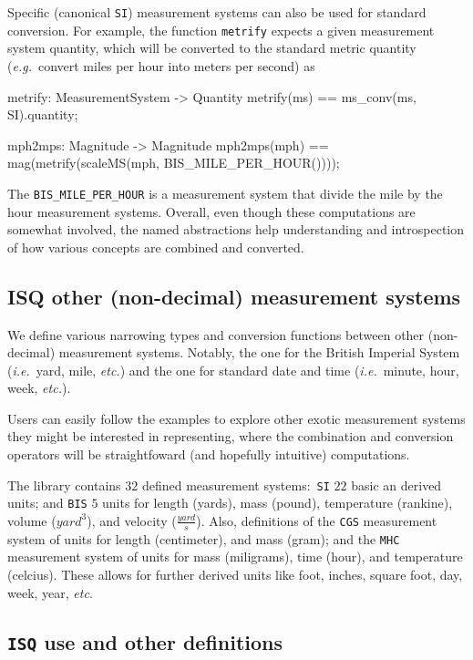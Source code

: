 \documentclass[runningheads,a4paper]{llncs}
\begin{document}
Specific (canonical \texttt{SI}) measurement systems can also be used for standard conversion. For example, the function \texttt{metrify} expects a given measurement system quantity, which will be converted to the standard metric quantity (\textit{e.g.}~convert miles per hour into meters per second) as
%
\begin{vdmsl}[frame=none,basicstyle=\ttfamily\scriptsize]
    metrify: MeasurementSystem -> Quantity
    metrify(ms) == ms_conv(ms, SI).quantity;

    mph2mps: Magnitude -> Magnitude
    mph2mps(mph) ==	mag(metrify(scaleMS(mph, BIS_MILE_PER_HOUR())));
\end{vdmsl}
%
\noindent The \texttt{BIS\_MILE\_PER\_HOUR} is a measurement system that divide the mile by the hour measurement systems. Overall, even though these computations are somewhat involved, the named abstractions help understanding and introspection of how various concepts are combined and converted.  

\subsection*{ISQ other (non-decimal) measurement systems}

We define various narrowing types and conversion functions between other (non-decimal) measurement systems. Notably, the one for the British Imperial System (\textit{i.e.}~yard, mile, \textit{etc.}) and the one for standard date and time (\textit{i.e.}~minute, hour, week, \textit{etc.}). 

Users can easily follow the examples to explore other exotic measurement systems they might be interested in representing, where the combination and conversion operators will be straightfoward (and hopefully intuitive) computations. 

The library contains \(32\) defined measurement systems:~\texttt{SI} \(22\) basic an derived units; and \texttt{BIS} \(5\) units for length (yards), mass (pound), temperature (rankine), volume (\(yard^3\)), and velocity (\(\frac{yard}{s}\)). Also, definitions of the \texttt{CGS} measurement system of units for length (centimeter), and mass (gram); and the \texttt{MHC} measurement system of units for mass (miligrams), time (hour), and temperature (celcius). These allows for further derived units like foot, inches, square foot, day, week, year, \textit{etc}. 

\subsection*{\texttt{ISQ} use and other definitions}
\end{document}
